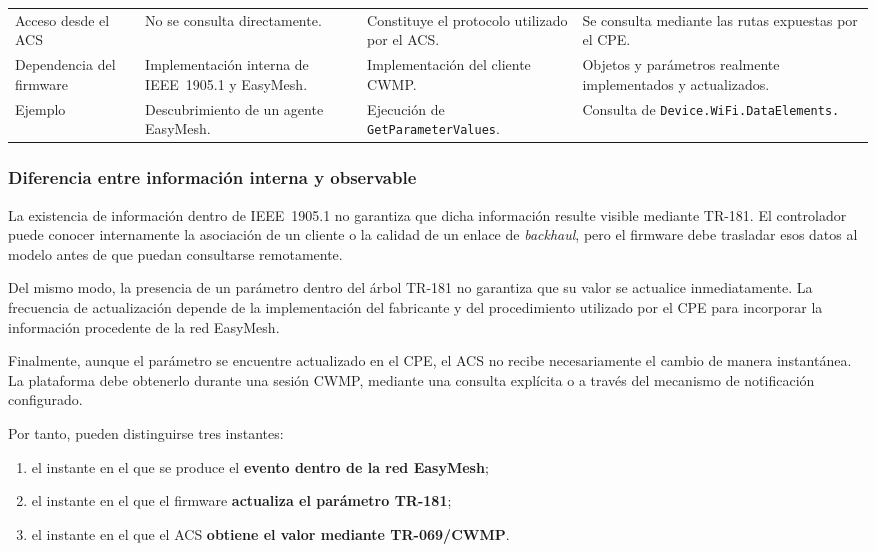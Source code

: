 \begin{table}[H]
\begin{tabular}{
        p{}
        p{}
        p{}
        p{}
    }
        Acceso desde el ACS
        &
        No se consulta directamente.
        &
        Constituye el protocolo utilizado por el ACS.
        &
        Se consulta mediante las rutas expuestas por el CPE.
        \\

        Dependencia del firmware
        &
        Implementación interna de IEEE~1905.1 y EasyMesh.
        &
        Implementación del cliente CWMP.
        &
        Objetos y parámetros realmente implementados y actualizados.
        \\

        Ejemplo
        &
        Descubrimiento de un agente EasyMesh.
        &
        Ejecución de \texttt{GetParameterValues}.
        &
        Consulta de \texttt{Device.WiFi.DataElements.}
        \\

        \hline
    \end{tabular}
\end{table}

\subsubsection*{Diferencia entre información interna y observable}

La existencia de información dentro de IEEE~1905.1 no garantiza que
dicha información resulte visible mediante TR-181. El controlador puede
conocer internamente la asociación de un cliente o la calidad de un
enlace de \textit{backhaul}, pero el firmware debe trasladar esos datos
al modelo antes de que puedan consultarse remotamente.

Del mismo modo, la presencia de un parámetro dentro del árbol TR-181 no
garantiza que su valor se actualice inmediatamente. La frecuencia de
actualización depende de la implementación del fabricante y del
procedimiento utilizado por el CPE para incorporar la información
procedente de la red EasyMesh.

Finalmente, aunque el parámetro se encuentre actualizado en el CPE, el
ACS no recibe necesariamente el cambio de manera instantánea. La
plataforma debe obtenerlo durante una sesión CWMP, mediante una consulta
explícita o a través del mecanismo de notificación configurado.

Por tanto, pueden distinguirse tres instantes:

\begin{enumerate}
    \item el instante en el que se produce el
    \textbf{evento dentro de la red EasyMesh};

    \item el instante en el que el firmware
    \textbf{actualiza el parámetro TR-181};

    \item el instante en el que el ACS
    \textbf{obtiene el valor mediante TR-069/CWMP}.
\end{enumerate}

